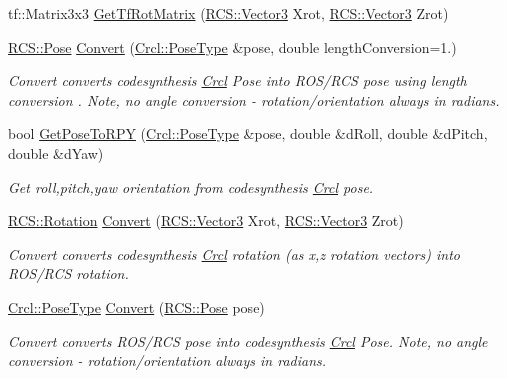 \begin{DoxyCompactItemize}
\item 
tf\-::\-Matrix3x3 \hyperlink{namespaceCrcl_aa63409c6fcf29259c733bd3221e5a6b2}{Get\-Tf\-Rot\-Matrix} (\hyperlink{namespaceRCS_a688a9db9f1e17b76c410c539997d07a7}{R\-C\-S\-::\-Vector3} Xrot, \hyperlink{namespaceRCS_a688a9db9f1e17b76c410c539997d07a7}{R\-C\-S\-::\-Vector3} Zrot)
\item 
\hyperlink{namespaceRCS_aa07e45d8a50e30064283d2b38087f999}{R\-C\-S\-::\-Pose} \hyperlink{namespaceCrcl_abd79cdab59edf05f88b02e6963862813}{Convert} (\hyperlink{namespaceCrcl_acc6c82b52280f4d0e74b82a92400956e}{Crcl\-::\-Pose\-Type} \&pose, double length\-Conversion=1.)
\begin{DoxyCompactList}\small\item\em Convert converts codesynthesis \hyperlink{namespaceCrcl}{Crcl} Pose into R\-O\-S/\-R\-C\-S pose using length conversion . Note, no angle conversion -\/ rotation/orientation always in radians. \end{DoxyCompactList}\item 
bool \hyperlink{namespaceCrcl_a394a527b4609a6d5b444f30bb9384f1a}{Get\-Pose\-To\-R\-P\-Y} (\hyperlink{namespaceCrcl_acc6c82b52280f4d0e74b82a92400956e}{Crcl\-::\-Pose\-Type} \&pose, double \&d\-Roll, double \&d\-Pitch, double \&d\-Yaw)
\begin{DoxyCompactList}\small\item\em Get roll,pitch,yaw orientation from codesynthesis \hyperlink{namespaceCrcl}{Crcl} pose. \end{DoxyCompactList}\item 
\hyperlink{namespaceRCS_a3fd915276fdb632d217c560523c320e0}{R\-C\-S\-::\-Rotation} \hyperlink{namespaceCrcl_a3cc4f0a80c975f2afab38ab2de262d1f}{Convert} (\hyperlink{namespaceRCS_a688a9db9f1e17b76c410c539997d07a7}{R\-C\-S\-::\-Vector3} Xrot, \hyperlink{namespaceRCS_a688a9db9f1e17b76c410c539997d07a7}{R\-C\-S\-::\-Vector3} Zrot)
\begin{DoxyCompactList}\small\item\em Convert converts codesynthesis \hyperlink{namespaceCrcl}{Crcl} rotation (as x,z rotation vectors) into R\-O\-S/\-R\-C\-S rotation. \end{DoxyCompactList}\item 
\hyperlink{namespaceCrcl_acc6c82b52280f4d0e74b82a92400956e}{Crcl\-::\-Pose\-Type} \hyperlink{namespaceCrcl_ac74920bcb32be055b5f94010fed04cb1}{Convert} (\hyperlink{namespaceRCS_aa07e45d8a50e30064283d2b38087f999}{R\-C\-S\-::\-Pose} pose)
\begin{DoxyCompactList}\small\item\em Convert converts R\-O\-S/\-R\-C\-S pose into codesynthesis \hyperlink{namespaceCrcl}{Crcl} Pose. Note, no angle conversion -\/ rotation/orientation always in radians. \end{DoxyCompactList}\item 

\end{DoxyCompactItemize}
